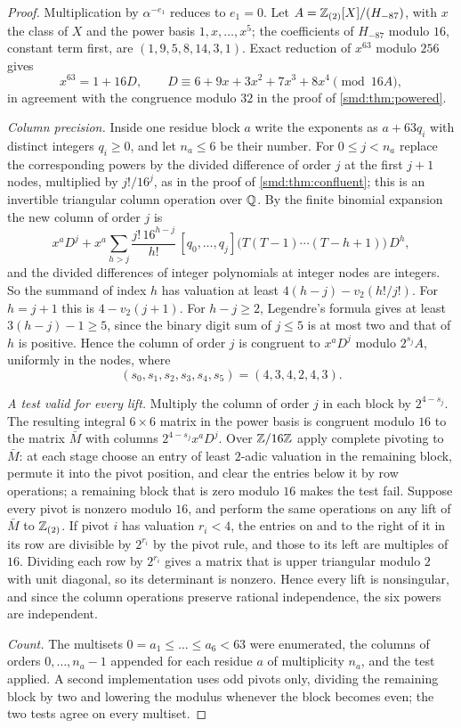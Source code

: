 \begin{proof}
Multiplication by $\alpha^{-e_1}$ reduces to $e_1=0$. Let $A=\mathbb{Z}_{(2)}[X]/(H_{-87})$, with
$x$ the class of $X$ and the power basis $1,x,\dots,x^5$; the coefficients of $H_{-87}$
modulo $16$, constant term first, are $(1,9,5,8,14,3,1)$. Exact reduction of $x^{63}$
modulo $256$ gives
\[
 x^{63}=1+16D,\qquad D\equiv6+9x+3x^2+7x^3+8x^4\pmod{16A},
\]
in agreement with the congruence modulo $32$ in the proof of \cref{smd:thm:powered}.

\emph{Column precision.} Inside one residue block $a$ write the exponents as $a+63q_i$ with
distinct integers $q_i\ge0$, and let $n_a\le6$ be their number. For $0\le j<n_a$ replace
the corresponding powers by the divided difference of order $j$ at the first $j+1$ nodes,
multiplied by $j!/16^j$, as in the proof of \cref{smd:thm:confluent}; this is an
invertible triangular column operation over $\mathbb{Q}$. By the finite binomial expansion the new
column of order $j$ is
\[
 x^aD^j+x^a\sum_{h>j}\frac{j!\,16^{h-j}}{h!}\,
 [q_0,\dots,q_j]\bigl(T(T-1)\cdots(T-h+1)\bigr)\,D^h ,
\]
and the divided differences of integer polynomials at integer nodes are integers. So the
summand of index $h$ has valuation at least $4(h-j)-v_2(h!/j!)$. For $h=j+1$ this is
$4-v_2(j+1)$. For $h-j\ge2$, Legendre's formula gives at least $3(h-j)-1\ge5$, since the
binary digit sum of $j\le5$ is at most two and that of $h$ is positive. Hence the column of
order $j$ is congruent to $x^aD^j$ modulo $2^{s_j}A$, uniformly in the nodes, where
\[
 (s_0,s_1,s_2,s_3,s_4,s_5)=(4,3,4,2,4,3).
\]

\emph{A test valid for every lift.} Multiply the column of order $j$ in each block by
$2^{4-s_j}$. The resulting integral $6\times6$ matrix in the power basis is congruent modulo
$16$ to the matrix $\bar M$ with columns $2^{4-s_j}x^aD^j$. Over $\mathbb{Z}/16\mathbb{Z}$ apply complete
pivoting to $\bar M$: at each stage choose an entry of least $2$-adic valuation in the
remaining block, permute it into the pivot position, and clear the entries below it by row
operations; a remaining block that is zero modulo $16$ makes the test fail. Suppose every
pivot is nonzero modulo $16$, and perform the same operations on any lift of $\bar M$ to
$\mathbb{Z}_{(2)}$. If pivot $i$ has valuation $r_i<4$, the entries on and to the right of it in its
row are divisible by $2^{r_i}$ by the pivot rule, and those to its left are multiples of
$16$. Dividing each row by $2^{r_i}$ gives a matrix that is upper triangular modulo $2$ with
unit diagonal, so its determinant is nonzero. Hence every lift is nonsingular, and since the
column operations preserve rational independence, the six powers are independent.

\emph{Count.} The multisets $0=a_1\le\dots\le a_6<63$ were enumerated, the columns of
orders $0,\dots,n_a-1$ appended for each residue $a$ of multiplicity $n_a$, and the test
applied. A second implementation uses odd pivots only, dividing the remaining block by two
and lowering the modulus whenever the block becomes even; the two tests agree on every
multiset.
\end{proof}

